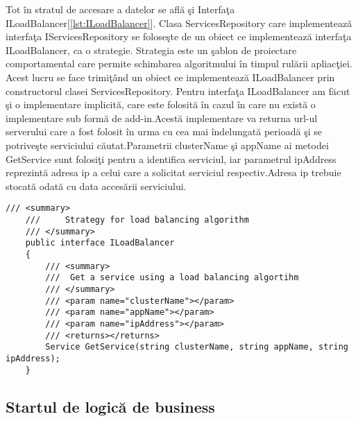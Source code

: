 \documentclass[a4paper,12pt]{report}
\let\oldref\ref
\renewcommand{\ref}[1]{[\oldref{#1}]}
\begin{document}
Tot \^in stratul de accesare a datelor se afl\u a \c si Interfa\c ta ILoadBalancer\ref{lst:ILoadBalancer}. Clasa ServicesRepository care implementeaz\u a
interfa\c ta IServicesRepository se folose\c ste de un obiect ce implementeaz\u a interfa\c ta ILoadBalancer, ca o strategie.
Strategia este un \c sablon de proiectare comportamental care permite schimbarea algoritmului \^in timpul rul\u arii apliac\c tiei.
Acest lucru se face trimi\c t\^and un obiect ce implementeaz\u a ILoadBalancer prin constructorul clasei ServicesRepository.
Pentru interfa\c ta ILoadBalancer am f\u acut \c si o implementare implicit\u a, care este folosit\u a \^in cazul \^in care nu exist\u a o implementare sub form\u a de 
add-in.Acest\u a implementare va returna url-ul serverului care a fost folosit \^in urma cu cea mai \^indelungat\u a perioad\u a \c si se potrive\c ste 
serviciului c\u autat.Parametrii clusterName \c si appName ai metodei GetService sunt folosi\c ti pentru a identifica serviciul,
iar  parametrul ipAddress reprezint\u a adresa ip a celui care a solicitat serviciul respectiv.Adresa ip trebuie stocat\u a odat\u a
cu data acces\u arii serviciului.

\begin{lstlisting}[caption={Interfa\c ta ILoadBalancer},label={lst:ILoadBalancer}, breaklines]	
    /// <summary>
    ///     Strategy for load balancing algorithm
    /// </summary>
    public interface ILoadBalancer
    {
        /// <summary>
        ///  Get a service using a load balancing algortihm
        /// </summary>
        /// <param name="clusterName"></param>
        /// <param name="appName"></param>
        /// <param name="ipAddress"></param>
        /// <returns></returns>
        Service GetService(string clusterName, string appName, string ipAddress);
    }
\end{lstlisting}

\pagebreak

\subsection{Startul de logic\u a de business}
\end{document}
